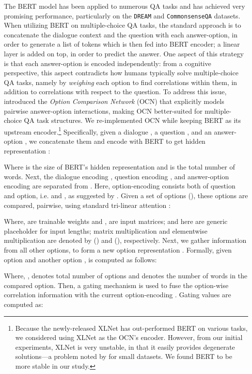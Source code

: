 \documentclass[11pt,a4paper]{article}
\begin{document}
The BERT model \cite{devlin-etal-2019-bert} has been applied to numerous QA tasks and has achieved very promising performance, particularly on the \texttt{DREAM} and \texttt{CommonsenseQA} datasets. When utilizing BERT on multiple-choice QA tasks, the standard approach is to concatenate the dialogue context and the question with each answer-option, in order to generate a list of tokens which is then fed into BERT encoder; a linear layer is added on top, in order to predict the answer. One aspect of this strategy is that each answer-option is encoded independently: from a cognitive perspective, this aspect contradicts how humans typically solve multiple-choice QA tasks, namely by \textit{weighing} each option to find correlations within them, in addition to correlations with respect to the question. To address this issue, \citet{DBLP:journals/corr/abs-1903-03033} introduced the \textit{Option Comparison Network} (OCN) that explicitly models pairwise answer-option interactions, making OCN better-suited for multiple-choice QA task structures. We re-implemented OCN while keeping BERT as its upstream encoder.\footnote{Because the newly-released XLNet has out-performed BERT on various tasks, we considered using XLNet as the OCN's encoder. However, from our initial experiments, XLNet is very unstable, in that it easily provides degenerate solutions---a problem noted by \citet{devlin-etal-2019-bert} for small datasets. We found BERT to be more stable in our study.} Specifically, given a dialogue , a question , and an answer-option , we concatenate them and encode with BERT to get hidden representation : 

Where  is the size of BERT's hidden representation and  is the total number of words. Next, the dialogue encoding , question encoding , and answer-option encoding 
are separated from . Here, option-encoding consists both of question and option, i.e.    and , as suggested by \citet{DBLP:journals/corr/abs-1903-03033}. Given a set of options  (), these options are compared, pairwise, using standard tri-linear attention \cite{Seo2016BidirectionalAF}:

Where,  are trainable weights and ,  are input matrices;  and  here are generic placeholder for input lengths; matrix multiplication and elementwise multiplication are denoted by () and (), respectively. Next, we gather information from all other options, to form a new option representation . Formally, given option  and another option ,  is computed as follows:

Where, ,  denotes total number of options and  denotes the number of words in the compared option. Then, a gating mechanism is used to fuse the option-wise correlation information  with the current option-encoding . Gating values are computed as:  
\end{document}
